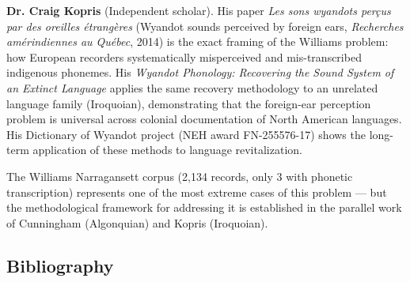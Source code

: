 \textbf{Dr. Craig Kopris} (Independent scholar). His paper \emph{Les sons
wyandots perçus par des oreilles étrangères} (Wyandot sounds perceived by
foreign ears, \emph{Recherches amérindiennes au Québec}, 2014) is the exact
framing of the Williams problem: how European recorders systematically
misperceived and mis-transcribed indigenous phonemes. His \emph{Wyandot
Phonology: Recovering the Sound System of an Extinct Language} applies the
same recovery methodology to an unrelated language family (Iroquoian),
demonstrating that the foreign-ear perception problem is universal across
colonial documentation of North American languages. His Dictionary of Wyandot
project (NEH award FN-255576-17) shows the long-term application of these
methods to language revitalization.

The Williams Narragansett corpus (2,134 records, only 3 with phonetic
transcription) represents one of the most extreme cases of this problem ---
but the methodological framework for addressing it is established in the
parallel work of Cunningham (Algonquian) and Kopris (Iroquoian).

\subsection{Bibliography}

